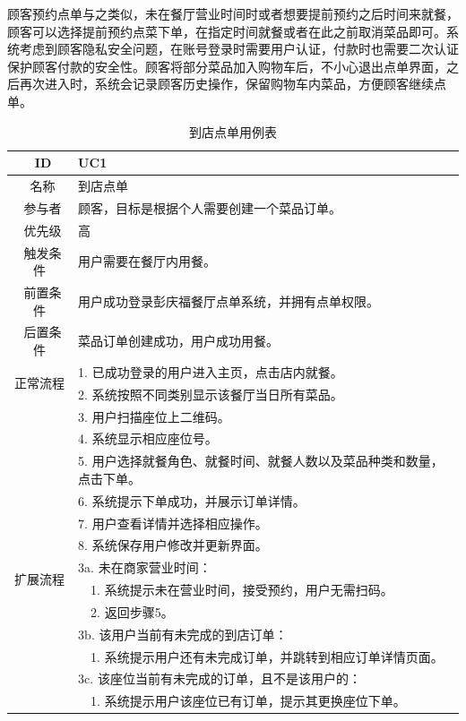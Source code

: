 顾客预约点单与之类似，未在餐厅营业时间时或者想要提前预约之后时间来就餐，顾客可以选择提前预约点菜下单，在指定时间就餐或者在此之前取消菜品即可。系统考虑到顾客隐私安全问题，在账号登录时需要用户认证，付款时也需要二次认证保护顾客付款的安全性。顾客将部分菜品加入购物车后，不小心退出点单界面，之后再次进入时，系统会记录顾客历史操作，保留购物车内菜品，方便顾客继续点单。

\begin{table}[htbp!]
  \footnotesize
  \centering
  \caption{到店点单用例表}
  \vspace{2mm}
  \begin{tabular}{cp{11.5cm}}
   \hline
   \ ID & UC1 \\ 
   \hline
   \ 名称 & 到店点单 \\ 
   \hline
   \ 参与者 & 顾客，目标是根据个人需要创建一个菜品订单。 \\ 
   \hline
   \ 优先级 & 高 \\ 
   \hline
   \ 触发条件 & 用户需要在餐厅内用餐。 \\ 
   \hline
   \ 前置条件 & 用户成功登录彭庆福餐厅点单系统，并拥有点单权限。 \\ 
   \hline
   \ 后置条件 & 菜品订单创建成功，用户成功用餐。 \\ 
   \hline
   \multirow{2}{*}{正常流程}
    & 1.	已成功登录的用户进入主页，点击店内就餐。\\
    & 2.	系统按照不同类别显示该餐厅当日所有菜品。\\
    & 3.	用户扫描座位上二维码。\\
    & 4.	系统显示相应座位号。\\
    & 5.	用户选择就餐角色、就餐时间、就餐人数以及菜品种类和数量，点击下单。\\
    & 6.	系统提示下单成功，并展示订单详情。\\
    & 7.	用户查看详情并选择相应操作。\\
    & 8.  系统保存用户修改并更新界面。 \\
   \hline
   \multirow{2}{*}{扩展流程}
    & 3a. 未在商家营业时间：\\
    & ~~1.	系统提示未在营业时间，接受预约，用户无需扫码。\\
    & ~~2.	返回步骤5。\\
    & 3b. 该用户当前有未完成的到店订单：\\
    & ~~1.	系统提示用户还有未完成订单，并跳转到相应订单详情页面。\\
    & 3c. 该座位当前有未完成的订单，且不是该用户的：\\
    & ~~1.	系统提示用户该座位已有订单，提示其更换座位下单。\\

\end{tabular}
\end{table}
